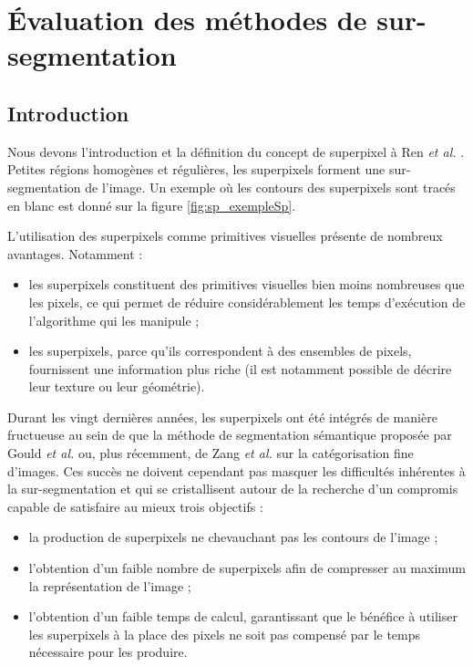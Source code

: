 \chapter{ Évaluation des méthodes de sur-segmentation}

\section{Introduction}
Nous devons l'introduction et la définition du concept de superpixel à Ren \textit{et al.} \cite{ren2003learning}. Petites régions homogènes et régulières, les superpixels forment une sur-segmentation de l'image. Un exemple où les contours des superpixels sont tracés en blanc est donné sur la figure \ref{fig:sp_exempleSp}.

L'utilisation des superpixels comme primitives visuelles présente de nombreux avantages. Notamment :
\begin{itemize}
\item les superpixels constituent des primitives visuelles bien moins nombreuses que les pixels, ce qui  permet de réduire considérablement les temps d'exécution de l'algorithme qui les manipule ;
\item les superpixels, parce qu'ils correspondent à des ensembles de pixels, fournissent une information plus riche (il est notamment possible de décrire leur texture ou leur géométrie).
\end{itemize}

Durant les vingt dernières années, les superpixels ont été intégrés de manière fructueuse au sein de  que la méthode de segmentation sémantique  proposée par Gould \textit{et al.} \cite{gould2008multi} ou, plus récemment,  de Zang \textit{et al.} \cite{zhang2016detecting} sur la catégorisation fine d'images. Ces succès ne doivent cependant pas masquer les difficultés inhérentes à la sur-segmentation et qui se cristallisent autour de la recherche d'un compromis capable de satisfaire au mieux trois objectifs : 
\begin{itemize}
\item la production de superpixels ne chevauchant pas les contours de l'image ;
\item l'obtention d'un faible nombre de superpixels afin de compresser au maximum la représentation de l'image ;
\item l'obtention d'un faible temps de calcul, garantissant que le bénéfice à utiliser les superpixels à la place des pixels ne soit pas compensé par le temps nécessaire pour les produire. 
\end{itemize}

